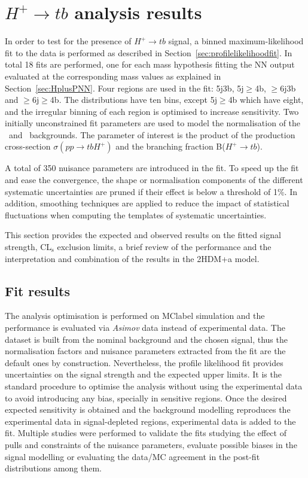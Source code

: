 \chapter{$H^+\to tb$ analysis results}
In order to test for the presence of $H^+\to tb$ signal, a binned maximum-likelihood fit to the data is performed as described in Section~\ref{sec:profilelikelihoodfit}. In total 18 fits are performed, one for each mass hypothesis fitting the NN output evaluated at the corresponding mass values as explained in Section~\ref{sec:HplusPNN}. Four regions are used in the fit: 5j3b, 5j$\geq$4b, $\geq$6j3b and $\geq$6j$\geq$4b. The distributions have ten bins, except 5j$\geq$4b which have eight, and the irregular binning of each region is optimised to increase sensitivity. Two initially unconstrained fit parameters are used to model the normalisation of the \ttb\ and \ttc\ backgrounds. The parameter of interest is the product of the production cross-section $\sigma(pp\to tbH^+)$ and the branching fraction B($H^+\to tb$).

A total of 350 nuisance parameters are introduced in the fit. To speed up the fit and ease the convergence, the shape or normalisation components of the different systematic uncertainties are pruned if their effect is below a threshold of 1\%. In addition, smoothing techniques are applied to reduce the impact of statistical fluctuations when computing the templates of systematic uncertainties.

This section provides the expected and observed results on the fitted signal strength, CL$_{\text{s}}$ exclusion limits, a brief review of the performance and the interpretation and combination of the results in the 2HDM+a model.

\section{Fit results}

The analysis optimisation is performed on \acrshort{MClabel} simulation and the performance is evaluated via \textit{Asimov} data instead of experimental data. The dataset is built from the nominal background and the chosen signal, thus the normalisation factors and nuisance parameters extracted from the fit are the default ones by construction. Nevertheless, the profile likelihood fit provides uncertainties on the signal strength and the expected upper limits. It is the standard procedure to optimise the analysis without using the experimental data to avoid introducing any bias, specially in sensitive regions. Once the desired expected sensitivity is obtained and the background modelling reproduces the experimental data in signal-depleted regions, experimental data is added to the fit. Multiple studies were performed to validate the fits studying the effect of pulls and constraints of the nuisance parameters, evaluate possible biases in the signal modelling or evaluating the data/MC agreement in the post-fit distributions among them.

